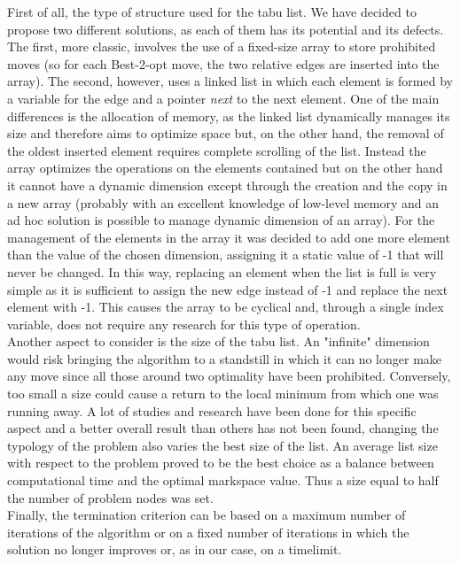 First of all, the type of structure used for the tabu list. We have decided to propose two different solutions, as each of them has its potential and its defects. The first, more classic, involves the use of a fixed-size array to store prohibited moves (so for each Best-2-opt move, the two relative edges are inserted into the array). The second, however, uses a linked list in which each element is formed by a variable for the edge and a pointer \textit{next} to the next element.
One of the main differences is the allocation of memory, as the linked list dynamically manages its size and therefore aims to optimize space but, on the other hand, the removal of the oldest inserted element requires complete scrolling of the list. Instead the array optimizes the operations on the elements contained but on the other hand it cannot have a dynamic dimension except through the creation and the copy in a new array (probably with an excellent knowledge of low-level memory and an ad hoc solution is possible to manage dynamic dimension of an array). For the management of the elements in the array it was decided to add one more element than the value of the chosen dimension, assigning it a static value of -1 that will never be changed. In this way, replacing an element when the list is full is very simple as it is sufficient to assign the new edge instead of -1 and replace the next element with -1. This causes the array to be cyclical and, through a single index variable, does not require any research for this type of operation.\\
Another aspect to consider is the size of the tabu list. An "infinite" dimension would risk bringing the algorithm to a standstill in which it can no longer make any move since all those around two optimality have been prohibited. Conversely, too small a size could cause a return to the local minimum from which one was running away. A lot of studies and research have been done for this specific aspect \cite{Nababan_2019, Tsubakitani1998} and a better overall result than others has not been found, changing the typology of the problem also varies the best size of the list. An average list size with respect to the problem proved to be the best choice as a balance between computational time and the optimal markspace value. Thus a size equal to half the number of problem nodes was set.\\
Finally, the termination criterion can be based on a maximum number of iterations of the algorithm or on a fixed number of iterations in which the solution no longer improves or, as in our case, on a timelimit.
